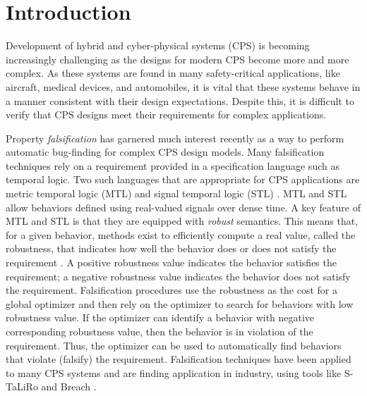 \section{Introduction} \label{sec:introduction}

Development of hybrid and cyber-physical systems (CPS) is becoming
increasingly challenging as the designs for modern CPS become more and
more complex.  As these systems are found in many safety-critical
applications, like aircraft, medical devices, and automobiles, it is
vital that these systems behave in a manner consistent with their
design expectations. Despite this, it is difficult to verify that CPS
designs meet their requirements for complex applications.


Property \emph{falsification} has garnered much interest recently as a
way to perform automatic bug-finding for complex CPS design
models. Many falsification techniques rely on a requirement
provided in a specification language such as temporal logic.
Two such
languages that are appropriate for CPS applications are metric
temporal logic (MTL) and signal temporal logic (STL)
\cite{Koymans1990,MalerN04}. MTL and STL allow behaviors defined
using real-valued signals over dense time. A key feature of MTL and
STL is that they are equipped with \emph{robust} semantics. This means
that, for a given behavior, methods exist to efficiently compute a
real value, called the robustness, that indicates how well the
behavior does or does not satisfy the requirement
\cite{FainekosP06fates,DonzeM10}. A positive robustness value
indicates the behavior satisfies the requirement; a negative
robustness value indicates the behavior does not satisfy the
requirement. Falsification procedures use the robustness as the cost
for a global optimizer and then rely on the optimizer to search for
behaviors with low robustness value. If the optimizer can identify a
behavior with negative corresponding robustness value, then the
behavior is in violation of the requirement. Thus, the optimizer can
be used to automatically find behaviors that violate (falsify) the
requirement. Falsification techniques have been applied to many CPS
systems and are finding application in industry, using tools like
S-TaLiRo and Breach \cite{TaliroLFS11,BreachCAV10}.

